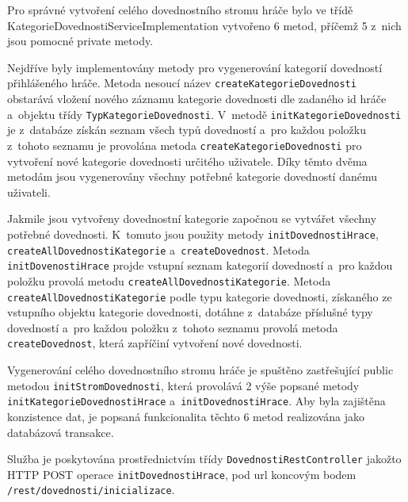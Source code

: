 \documentclass[12pt]{article}
\begin{document}
\clearpage

\obrazek
{}

Pro správné vytvoření celého dovednostního stromu hráče bylo ve třídě KategorieDovednostiServiceImplementation vytvořeno 6 metod, příčemž 5 z~nich jsou pomocné private metody.

Nejdříve byly implementovány metody pro vygenerování kategorií dovedností přihlášeného hráče. Metoda nesoucí název \texttt{createKategorieDovednosti} obstarává vložení nového záznamu kategorie dovednosti dle zadaného id hráče a~objektu třídy \texttt{TypKategorieDovednosti}.
V~metodě \texttt{initKategorieDovednosti} je z~databáze získán seznam všech typů dovedností a~pro každou položku z~tohoto seznamu je provolána metoda \texttt{createKategorieDovednosti} pro vytvoření nové kategorie dovednosti určitého uživatele. Díky těmto dvěma metodám jsou vygenerovány všechny potřebné kategorie dovedností danému uživateli. 

Jakmile jsou vytvořeny dovednostní kategorie započnou se vytvářet všechny potřebné dovednosti. K~tomuto jsou použity metody \texttt{initDovednostiHrace}, \texttt{createAllDovednostiKategorie} a~\texttt{createDovednost}. Metoda \texttt{initDovenostiHrace} projde vstupní seznam kategorií dovedností a~pro každou položku provolá metodu \texttt{createAllDovednostiKategorie}. Metoda \texttt{createAllDovednostiKategorie}  podle typu kategorie dovednosti, získaného ze vstupního objektu kategorie dovednosti, dotáhne z~databáze příslušné typy dovedností a~pro každou položku z~tohoto seznamu provolá metoda \texttt{createDovednost}, která zapříčiní vytvoření nové dovednosti. 

Vygenerování celého dovednostního stromu hráče je spuštěno zastřešující public metodou \texttt{initStromDovednosti}, která provolává 2 výše popsané metody \texttt{initKategorieDovednostiHrace} a~\texttt{initDovednostiHrace}. Aby byla zajištěna konzistence dat, je popsaná funkcionalita těchto 6 metod realizována jako databázová transakce. 

Služba je poskytována prostřednictvím třídy \texttt{DovednostiRestController} jakožto HTTP POST operace \texttt{initDovednostiHrace}, pod url koncovým bodem \texttt{/rest/dovednosti/inicializace}.
\end{document}

